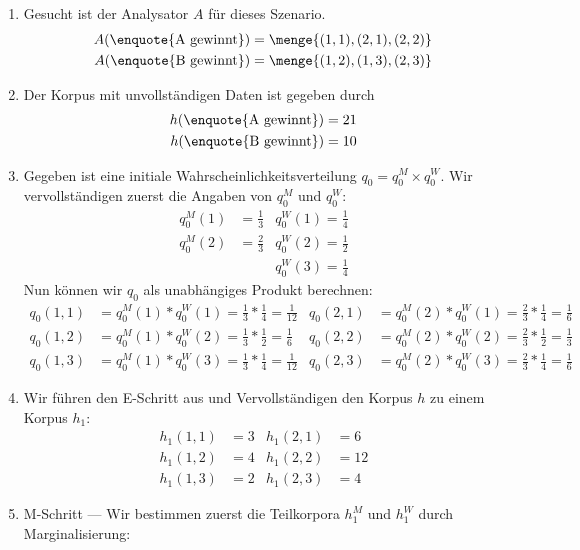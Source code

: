 \documentclass[ngerman, a4paper, 12pt]{article}
\begin{document}
	\begin{enumerate}[label=\textbf{(\alph*)}, leftmargin=0pt]
		\item Gesucht ist der Analysator $A$ für dieses Szenario.
		\begin{align*}
			A( \text{\enquote{A gewinnt}}) &= \menge{(1,1), (2,1), (2,2)} \\
			A( \text{\enquote{B gewinnt}}) &= \menge{(1,2), (1,3), (2,3)}			
		\end{align*}
		\item Der Korpus mit unvollständigen Daten ist gegeben durch
		\begin{align*}
			h(\text{\enquote{A gewinnt}}) &= 21 \\
			h(\text{\enquote{B gewinnt}}) &= 10
 		\end{align*}
 		\item Gegeben ist eine initiale Wahrscheinlichkeitsverteilung $q_0 = q_0^M \times q_0^W$. Wir vervollständigen zuerst die Angaben von $q_0^M$ und $q_0^W$:
 		\begin{align*}
 			q_0^M(1) &= \frac{1}{3} & q_0^W(1) = \frac{1}{4} \\
 			q_0^M(2) &= \frac{2}{3} & q_0^W(2) = \frac{1}{2} \\
 			 		 &              & q_0^W(3) = \frac{1}{4} 
 		\end{align*}
 		Nun können wir $q_0$ als unabhängiges Produkt berechnen:
 		\begin{align*}
 			q_0(1,1) &= q_0^M(1) * q_0^W(1) = \frac{1}{3} * \frac{1}{4} = \frac{1}{12} &
 			q_0(2,1) &= q_0^M(2) * q_0^W(1) = \frac{2}{3} * \frac{1}{4} = \frac{1}{6} \\
 			q_0(1,2) &= q_0^M(1) * q_0^W(2) = \frac{1}{3} * \frac{1}{2} = \frac{1}{6} &
 			q_0(2,2) &= q_0^M(2) * q_0^W(2) = \frac{2}{3} * \frac{1}{2} = \frac{1}{3} \\
 			q_0(1,3) &= q_0^M(1) * q_0^W(3) = \frac{1}{3} * \frac{1}{4} = \frac{1}{12} &
 			q_0(2,3) &= q_0^M(2) * q_0^W(3) = \frac{2}{3} * \frac{1}{4} = \frac{1}{6}
 		\end{align*}
 		\item Wir führen den E-Schritt aus und Vervollständigen den Korpus $h$ zu einem Korpus $h_1$:
 		\begin{align*}
 			h_1(1,1) &= 3 & h_1(2,1) &= 6 \\
 			h_1(1,2) &= 4 & h_1(2,2) &= 12 \\
 			h_1(1,3) &= 2 & h_1(2,3) &= 4
 		\end{align*}
 		\item M-Schritt --- Wir bestimmen zuerst die Teilkorpora $h_1^M$ und $h_1^W$ durch Marginalisierung:

\end{enumerate}
\end{document}
